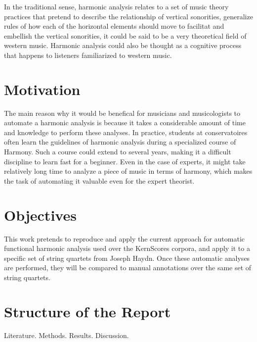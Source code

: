 In the traditional sense, harmonic analysis relates to a set of music theory practices that pretend to describe the relationship of vertical sonorities, generalize rules of how each of the horizontal elements should move to facilitat and embellish the vertical sonorities, it could be said to be a very theoretical field of western music. Harmonic analysis could also be thought as a cognitive process that happens to listeners familiarized to western music.

\section{Motivation}
The main reason why it would be benefical for musicians and musicologists to automate a harmonic analysis is because it takes a considerable amount of time and knowledge to perform these analyses. In practice, students at conservatoires often learn the guidelines of harmonic analysis during a specialized course of Harmony. Such a course could extend to several years, making it a difficult discipline to learn fast for a beginner. Even in the case of experts, it might take relatively long time to analyze a piece of music in terms of harmony, which makes the task of automating it valuable even for the expert theorist.

\section{Objectives}
This work pretends to reproduce and apply the current approach for automatic functional harmonic analysis used over the KernScores corpora, and apply it to a specific set of string quartets from Joseph Haydn. Once these automatic analyses are performed, they will be compared to manual annotations over the same set of string quartets.

\section{Structure of the Report}
Literature. Methods. Results. Discussion.

\newpage
